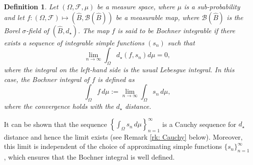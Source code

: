 \documentclass[a4paper, 11pt]{article}
\newtheorem{df}{Definition}
\theoremstyle{definition}
\newcommand{\cB}{{\mathcal{B}}}
\begin{document}
{\begin{df}{\label{def: Bocnher}}
	Let \( (\Omega, \mathcal{F}, \mu) \) be a measure space, where $\mu$ is a sub-probability and let 
	$f : (\Omega, \mathcal{F}) \mapsto (\widehat{B},\cB(\widehat{B}))$ be a measurable map, where $\cB(\widehat{B})$ is the Borel $\sigma$-field of $(\widehat{B}, d_\star)$.
	The map $f$ is said to be Bochner integrable if there exists a sequence of integrable simple functions \( (s_n) \) such that
	\[
	\lim_{n \to \infty} \int_\Omega d_\star(f,s_n) d\mu = 0,
	\]
	where the integral on the left-hand side is the usual Lebesgue integral. In this case, the Bochner integral of \( f \) is defined as
	\[
	\int_\Omega f \, d\mu := \lim_{n \to \infty} \int_\Omega s_n \, d\mu,
	\]
	where the convergence holds with the $d_\star$ distance.
\end{df}
%
%

It can be shown that the sequence \( \left\{ \int_{\Omega} s_n \, d\mu \right\}_{n=1}^\infty \) is a Cauchy sequence for $d_\star$ distance %
and hence the limit exists (see Remark \ref{rk: Cauchy} below). Moreover, this limit is independent of the choice of approximating simple functions \( \{s_n\}_{n=1}^\infty \), which ensures that the Bochner integral is well defined. 


}
\end{document}
